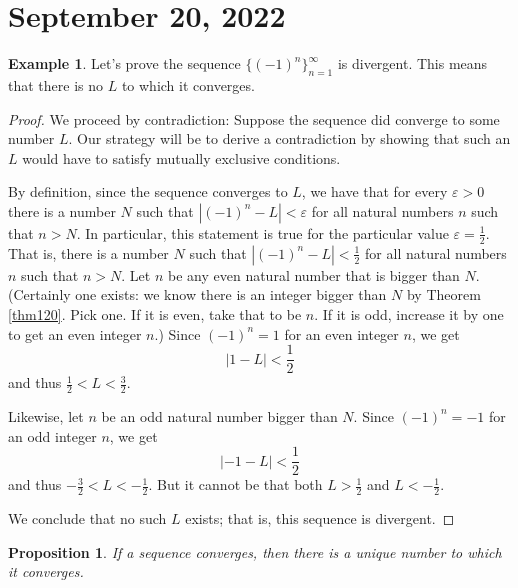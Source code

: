 \documentclass[12pt]{amsart}
\def\e{\varepsilon}
\numberwithin{equation}{section}
\theoremstyle{plain} %
\newtheorem{prop}[equation]{Proposition}
\newcommand{\Sept}[1]{\section{September #1, 2022}}
\theoremstyle{definition}
\newtheorem{ex}[equation]{Example}
\theoremstyle{remark}
\begin{document}
\Sept{20}




\begin{ex} Let's prove the sequence $\{(-1)^n\}_{n=1}^\infty$ is divergent. This means that there is no $L$ to which it converges. 

\begin{proof}
  We proceed by contradiction: Suppose the sequence did converge to some number $L$. Our strategy will be to derive a contradiction by showing that such
  an $L$ would have to satisfy mutually exclusive conditions. 

By definition, since the sequence converges to $L$, we have that 
for every $\e > 0$ there is a number $N$ such that 
$|(-1)^n - L| < \e$
for all natural numbers $n$ such that $n > N$.
In particular, this statement is true for the particular value $\e = \frac12$. That is,  there is a number $N$ such that  
$|(-1)^n - L| < \frac12$ for all natural numbers $n$ such that  
$n > N$. Let $n$ be any even natural number that is bigger than
$N$. (Certainly one exists: we know there is an integer bigger than
$N$
by Theorem \ref{thm120}. Pick one. If it is even, take that to be
$n$. If it is odd, increase it by one to get an even integer $n$.)  Since $(-1)^n = 1$ for an even integer $n$, we get
$$
|1 - L| < \frac12
$$
and thus $\frac12 < L < \frac32$.

Likewise, let $n$ be an odd natural number bigger than $N$. Since $(-1)^n = -1$ for an odd integer $n$, we get
$$
|-1 - L| < \frac12
$$
and thus $-\frac32 < L < -\frac12$. But it cannot be that both $L > \frac12$ and $L < -\frac12$.

We conclude that no such $L$ exists; that is, this sequence is divergent.
\end{proof}
\end{ex}



\begin{prop} If a sequence converges, then there is a unique number to which it converges.
\end{prop}
\end{document}
